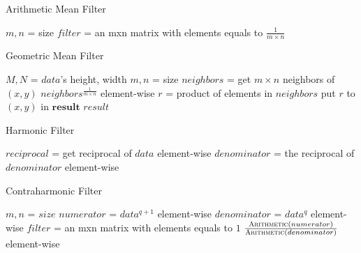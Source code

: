 \documentclass{article}
\begin{document}
  \newpage

  \begin{algorithm}
    \caption{Arithmetic Mean Filter}
    \label{Arithmetic}
    \begin{algorithmic}[1]
    \State $m,n$ = size
    \State $filter$ = an mxn matrix with elements equals to $\frac{1}{m\times n}$
    \State \Return {}
    \EndFunction
    \end{algorithmic}
  \end{algorithm}

  \begin{algorithm}
    \caption{Geometric Mean Filter}
    \label{Geometric}
    \begin{algorithmic}[1]
    \State $M, N$ = $data$'s height, width
    \State $m, n$ = size
    \State $neighbors$ = get $m\times n$ neighbors of $(x,y)$
    \State $neighbors^{\frac{1}{m\times n}}$ element-wise
    \State $r$ = product of elements in $neighbors$
    \State put $r$ to $(x,y)$ in $\mathbf{result}$
    \EndFor
    \State \Return $result$
    \EndFunction
    \end{algorithmic}
  \end{algorithm}

  \newpage

  \begin{algorithm}
    \caption{Harmonic Filter}
    \label{Harmonic}
    \begin{algorithmic}[1]
    \State $reciprocal$ = get reciprocal of $data$ element-wise
    \State $denominator$ = 
    \State \Return the reciprocal of $denominator$ element-wise
    \EndFunction
    \end{algorithmic}
  \end{algorithm}

  \begin{algorithm}
    \caption{Contraharmonic Filter}
    \label{Contraharmonic}
    \begin{algorithmic}[1]
    \State $m,n$ = $size$
    \State $numerator$ = $data^{q+1}$ element-wise
    \State $denominator$ = $data^{q}$ element-wise
    \State $filter$ = an mxn matrix with elements equals to $1$
    \State \Return $\frac{\Call{Arithmetic}{numerator}}{\Call{Arithmetic}{denominator}}$ element-wise
    \EndFunction
    \end{algorithmic}
  \end{algorithm}
\end{document}

